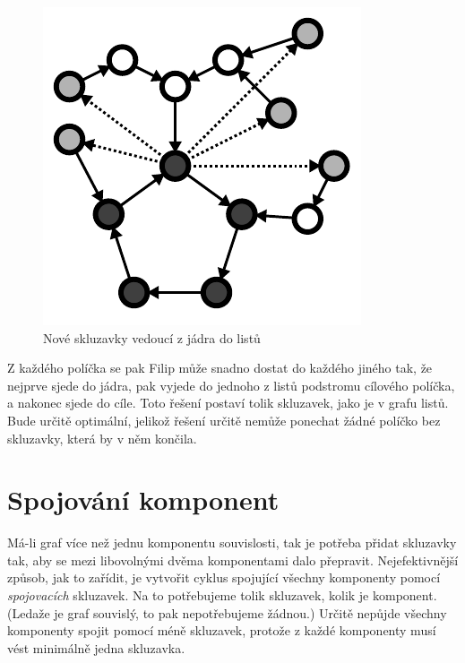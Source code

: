\documentclass{article}
\begin{document}
\begin{figure}[ht]
    \centering
    \includegraphics{back-edge.pdf}
    \caption{Nové skluzavky vedoucí z jádra do listů}
\end{figure}

Z každého políčka se pak Filip může snadno dostat do každého jiného tak, že nejprve sjede do jádra, pak vyjede do jednoho z listů podstromu cílového políčka, a nakonec sjede do cíle. Toto řešení postaví tolik skluzavek, jako je v grafu listů. Bude určitě optimální, jelikož řešení určitě nemůže ponechat žádné políčko bez skluzavky, která by v něm končila.

\section{Spojování komponent}

Má-li graf více než jednu komponentu souvislosti, tak je potřeba přidat skluzavky tak, aby se mezi libovolnými dvěma komponentami dalo přepravit. Nejefektivnější způsob, jak to zařídit, je vytvořit cyklus spojující všechny komponenty pomocí \textit{spojovacích} skluzavek. Na to potřebujeme tolik skluzavek, kolik je komponent. (Ledaže je graf souvislý, to pak nepotřebujeme žádnou.) Určitě nepůjde všechny komponenty spojit pomocí méně skluzavek, protože z každé komponenty musí vést minimálně jedna skluzavka.
\end{document}
